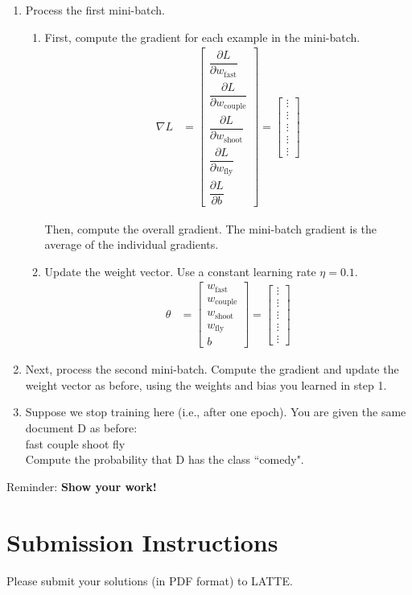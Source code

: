 \documentclass[11pt,letterpaper]{article}
\begin{document}
\begin{enumerate}
\item Process the first mini-batch.
\begin{enumerate}
\item First, compute the gradient for each example in the mini-batch.
\begin{align*}
\nabla L &= \begin{bmatrix}
\dfrac{\partial L}{\partial w_\mathrm{fast}} \\[11pt]
\dfrac{\partial L}{\partial w_\mathrm{couple}} \\[11pt]
\dfrac{\partial L}{\partial w_\mathrm{shoot}} \\[11pt]
\dfrac{\partial L}{\partial w_\mathrm{fly}} \\[11pt]
\dfrac{\partial L}{\partial b}
\end{bmatrix} = \begin{bmatrix}
\vdots \\[11pt]
\vdots \\[11pt]
\vdots \\[11pt]
\vdots \\[11pt]
\vdots
\end{bmatrix}
\end{align*}

Then, compute the overall gradient. The mini-batch gradient is the average of the individual gradients.
\item Update the weight vector. Use a constant learning rate $\eta=0.1$.
\begin{align*}
\theta &= \begin{bmatrix}
w_\mathrm{fast} \\[7pt]
w_\mathrm{couple} \\[7pt]
w_\mathrm{shoot} \\[7pt]
w_\mathrm{fly} \\[7pt]
b
\end{bmatrix} = \begin{bmatrix}
\vdots \\
\vdots \\
\vdots \\
\vdots \\
\vdots
\end{bmatrix}
\end{align*}

\end{enumerate}
\item Next, process the second mini-batch. Compute the gradient and update the weight vector as before, using the weights and bias you learned in step 1.
\item Suppose we stop training here (i.e., after one epoch). You are given the same document D as before:\\

\hspace{22pt}fast couple shoot fly\\

Compute the probability that D has the class ``comedy".
\end{enumerate}

\noindent Reminder: \textbf{Show your work!}

\section*{Submission Instructions}

Please submit your solutions (in PDF format) to LATTE.
\end{document}
